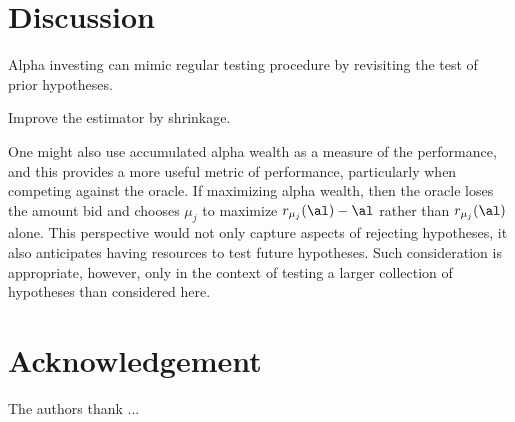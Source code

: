 \documentclass[12pt]{article}
\begin{document}
\section{Discussion}

Alpha investing can mimic regular testing procedure by revisiting the test of
prior hypotheses. 

Improve the estimator by shrinkage.


One might also use accumulated alpha wealth as a measure of the performance, and
 this provides a more useful metric of performance, particularly when competing
 against the oracle.  If maximizing alpha wealth, then the oracle loses the
 amount bid and chooses $\mu_j$ to maximize $r_{\mu_j}(\al)-\al$ rather than
 $r_{\mu_j}(\al)$ alone.  This perspective would not only capture aspects of
 rejecting hypotheses, it also anticipates having resources to test future
 hypotheses.  Such consideration is appropriate, however, only in the context of
 testing a larger collection of hypotheses than considered here.



\section*{Acknowledgement}

The authors thank ...





\end{document}
